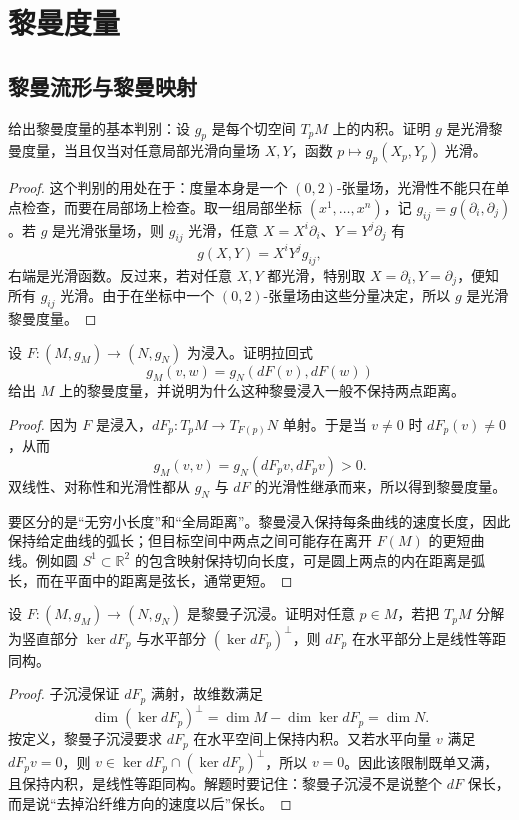 \documentclass[11pt,a4paper,openany]{ctexbook}
\numberwithin{equation}{chapter}
\begin{document}
\frontmatter
\tableofcontents
\mainmatter

\chapter{黎曼度量}

\section{黎曼流形与黎曼映射}

\begin{problem}
给出黎曼度量的基本判别：设 \(g_p\) 是每个切空间 \(T_pM\) 上的内积。证明 \(g\) 是光滑黎曼度量，当且仅当对任意局部光滑向量场 \(X,Y\)，函数 \(p\mapsto g_p(X_p,Y_p)\) 光滑。
\end{problem}
\begin{proof}
这个判别的用处在于：度量本身是一个 \((0,2)\)-张量场，光滑性不能只在单点检查，而要在局部场上检查。取一组局部坐标 \((x^1,\ldots,x^n)\)，记 \(g_{ij}=g(\partial_i,\partial_j)\)。若 \(g\) 是光滑张量场，则 \(g_{ij}\) 光滑，任意 \(X=X^i\partial_i\)、\(Y=Y^j\partial_j\) 有
\[
g(X,Y)=X^iY^jg_{ij},
\]
右端是光滑函数。反过来，若对任意 \(X,Y\) 都光滑，特别取 \(X=\partial_i,Y=\partial_j\)，便知所有 \(g_{ij}\) 光滑。由于在坐标中一个 \((0,2)\)-张量场由这些分量决定，所以 \(g\) 是光滑黎曼度量。
\end{proof}

\begin{problem}
设 \(F\colon (M,g_M)\to (N,g_N)\) 为浸入。证明拉回式
\[
g_M(v,w)=g_N(dF(v),dF(w))
\]
给出 \(M\) 上的黎曼度量，并说明为什么这种黎曼浸入一般不保持两点距离。
\end{problem}
\begin{proof}
因为 \(F\) 是浸入，\(dF_p\colon T_pM\to T_{F(p)}N\) 单射。于是当 \(v\ne0\) 时 \(dF_p(v)\ne0\)，从而
\[
g_M(v,v)=g_N(dF_pv,dF_pv)>0.
\]
双线性、对称性和光滑性都从 \(g_N\) 与 \(dF\) 的光滑性继承而来，所以得到黎曼度量。

要区分的是“无穷小长度”和“全局距离”。黎曼浸入保持每条曲线的速度长度，因此保持给定曲线的弧长；但目标空间中两点之间可能存在离开 \(F(M)\) 的更短曲线。例如圆 \(S^1\subset\mathbb R^2\) 的包含映射保持切向长度，可是圆上两点的内在距离是弧长，而在平面中的距离是弦长，通常更短。
\end{proof}

\begin{problem}
设 \(F\colon (M,g_M)\to (N,g_N)\) 是黎曼子沉浸。证明对任意 \(p\in M\)，若把 \(T_pM\) 分解为竖直部分 \(\ker dF_p\) 与水平部分 \((\ker dF_p)^\perp\)，则 \(dF_p\) 在水平部分上是线性等距同构。
\end{problem}
\begin{proof}
子沉浸保证 \(dF_p\) 满射，故维数满足
\[
\dim(\ker dF_p)^\perp=\dim M-\dim\ker dF_p=\dim N.
\]
按定义，黎曼子沉浸要求 \(dF_p\) 在水平空间上保持内积。又若水平向量 \(v\) 满足 \(dF_pv=0\)，则 \(v\in \ker dF_p\cap(\ker dF_p)^\perp\)，所以 \(v=0\)。因此该限制既单又满，且保持内积，是线性等距同构。解题时要记住：黎曼子沉浸不是说整个 \(dF\) 保长，而是说“去掉沿纤维方向的速度以后”保长。
\end{proof}
\end{document}
